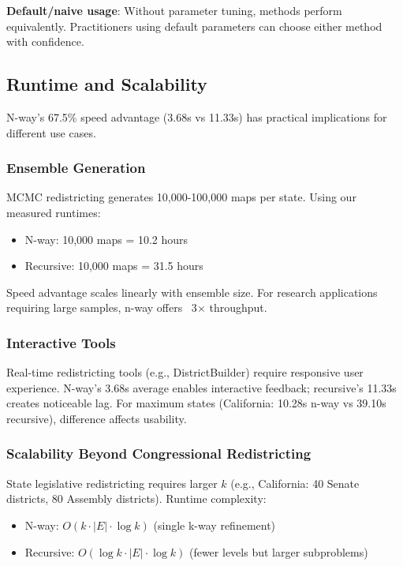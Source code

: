 \textbf{Default/naive usage}: Without parameter tuning, methods perform equivalently. Practitioners using default parameters can choose either method with confidence.

\subsection{Runtime and Scalability}

N-way's 67.5\% speed advantage (3.68s vs 11.33s) has practical implications for different use cases.

\subsubsection{Ensemble Generation}

MCMC redistricting generates 10,000-100,000 maps per state. Using our measured runtimes:
\begin{itemize}
\item N-way: 10,000 maps = 10.2 hours
\item Recursive: 10,000 maps = 31.5 hours
\end{itemize}

Speed advantage scales linearly with ensemble size. For research applications requiring large samples, n-way offers ~3$\times$ throughput.

\subsubsection{Interactive Tools}

Real-time redistricting tools (e.g., DistrictBuilder) require responsive user experience. N-way's 3.68s average enables interactive feedback; recursive's 11.33s creates noticeable lag. For maximum states (California: 10.28s n-way vs 39.10s recursive), difference affects usability.

\subsubsection{Scalability Beyond Congressional Redistricting}

State legislative redistricting requires larger $k$ (e.g., California: 40 Senate districts, 80 Assembly districts). Runtime complexity:
\begin{itemize}
\item N-way: $O(k \cdot |E| \cdot \log k)$ (single k-way refinement)
\item Recursive: $O(\log k \cdot |E| \cdot \log k)$ (fewer levels but larger subproblems)
\end{itemize}

